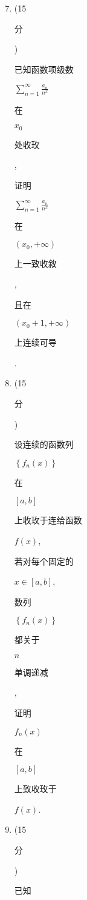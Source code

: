 \documentclass[10pt]{article}
\begin{document}
\begin{enumerate}
  \setcounter{enumi}{6}
  \item (15 \begin{CJK}{UTF8}{mj}分\end{CJK}) \begin{CJK}{UTF8}{mj}已知函数项级数\end{CJK} $\sum_{n=1}^{\infty} \frac{a_{n}}{n^{x}}$ \begin{CJK}{UTF8}{mj}在\end{CJK} $x_{0}$ \begin{CJK}{UTF8}{mj}处收玫\end{CJK}, \begin{CJK}{UTF8}{mj}证明\end{CJK} $\sum_{n=1}^{\infty} \frac{a_{n}}{n^{x}}$ \begin{CJK}{UTF8}{mj}在\end{CJK} $\left(x_{0},+\infty\right)$ \begin{CJK}{UTF8}{mj}上一致收敘\end{CJK}, \begin{CJK}{UTF8}{mj}且在\end{CJK} $\left(x_{0}+1,+\infty\right)$ \begin{CJK}{UTF8}{mj}上连续可导\end{CJK}.

  \item (15 \begin{CJK}{UTF8}{mj}分\end{CJK}) \begin{CJK}{UTF8}{mj}设连续的函数列\end{CJK} $\left\{f_{n}(x)\right\}$ \begin{CJK}{UTF8}{mj}在\end{CJK} $[a, b]$ \begin{CJK}{UTF8}{mj}上收玫于连给函数\end{CJK} $f(x)$, \begin{CJK}{UTF8}{mj}若对每个固定的\end{CJK} $x \in[a, b]$, \begin{CJK}{UTF8}{mj}数列\end{CJK} $\left\{f_{n}(x)\right\}$ \begin{CJK}{UTF8}{mj}都关于\end{CJK} $n$ \begin{CJK}{UTF8}{mj}单调递减\end{CJK}, \begin{CJK}{UTF8}{mj}证明\end{CJK} $f_{n}(x)$ \begin{CJK}{UTF8}{mj}在\end{CJK} $[a, b]$ \begin{CJK}{UTF8}{mj}上致收玫于\end{CJK} $f(x)$.

  \item (15 \begin{CJK}{UTF8}{mj}分\end{CJK}) \begin{CJK}{UTF8}{mj}已知\end{CJK}

\end{enumerate}
\end{document}
